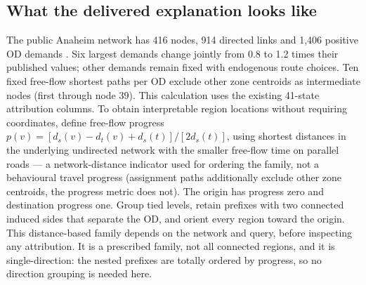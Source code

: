 \subsection{What the delivered explanation looks like}\label{sec:anaheim}
The public Anaheim network has 416 nodes, 914 directed links and 1,406 positive OD demands \citep{tnfrc2024transportation}. Six largest demands change jointly from 0.8 to 1.2 times their published values; other demands remain fixed with endogenous route choices. Ten fixed free-flow shortest paths per OD exclude other zone centroids as intermediate nodes (first through node 39). This calculation uses the existing 41-state attribution columns.
To obtain interpretable region locations without requiring coordinates, define free-flow progress $p(v)=[d_s(v)-d_t(v)+d_s(t)]/[2d_s(t)]$, using shortest distances in the underlying undirected network with the smaller free-flow time on parallel roads --- a network-distance indicator used for ordering the family, not a behavioural travel progress (assignment paths additionally exclude other zone centroids, the progress metric does not). The origin has progress zero and destination progress one. Group tied levels, retain prefixes with two connected induced sides that separate the OD, and orient every region toward the origin. This distance-based family depends on the network and query, before inspecting any attribution. It is a prescribed family, not all connected regions, and it is single-direction: the nested prefixes are totally ordered by progress, so no direction grouping is needed here.

